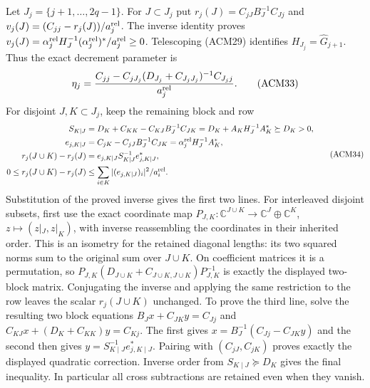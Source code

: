 Let $J_j=\{j+1,\ldots,2q-1\}$. For $J\subset J_j$ put
$r_j(J)=C_{jJ}B_J^{-1}C_{Jj}$ and
$v_j(J)=(C_{jj}-r_j(J))/a_j^{\rm rel}$.
The inverse identity proves
$v_j(J)=\alpha_j^{\rm rel}H_J^{-1}(\alpha_j^{\rm rel})^*/a_j^{\rm rel}
\geq0$. Telescoping (ACM29) identifies
$H_{J_j}=\widehat G_{j+1}$. Thus the exact decrement parameter is
\[
 \eta_j=
 \frac{C_{jj}-C_{jJ_j}(D_{J_j}+C_{J_jJ_j})^{-1}C_{J_jj}}
      {a_j^{\rm rel}}.
 \tag{ACM33}
\]
For disjoint $J,K\subset J_j$, keep the remaining block and row
\[
\begin{aligned}
 S_{K\mid J}&=D_K+C_{KK}-C_{KJ}B_J^{-1}C_{JK}
             =D_K+A_KH_J^{-1}A_K^*\succeq D_K>0,\\
 e_{j,K\mid J}&=C_{jK}-C_{jJ}B_J^{-1}C_{JK}
                =\alpha_j^{\rm rel}H_J^{-1}A_K^*,\\
 r_j(J\cup K)-r_j(J)&=e_{j,K\mid J}S_{K\mid J}^{-1}e_{j,K\mid J}^*,\\
 0\leq r_j(J\cup K)-r_j(J)
 &\leq\sum_{i\in K}|(e_{j,K\mid J})_i|^2/a_i^{\rm rel}.
\end{aligned}\tag{ACM34}
\]
Substitution of the proved inverse gives the first two lines.
For interleaved disjoint subsets, first use the exact coordinate map
$P_{J,K}:\mathbb{C}^{J\cup K}\to\mathbb{C}^J\oplus\mathbb{C}^K$,
$z\mapsto(z|_J,z|_K)$, with inverse reassembling the coordinates
in their inherited order. This is an isometry for the retained
diagonal lengths: its two squared norms sum to the original
sum over $J\cup K$. On coefficient matrices it is a permutation,
so $P_{J,K}(D_{J\cup K}+C_{J\cup K,J\cup K})P_{J,K}^{-1}$
is exactly the displayed two-block matrix. Conjugating the inverse
and applying the same restriction to the row leaves the scalar
$r_j(J\cup K)$ unchanged. To prove the third line, solve the
resulting two block equations
$B_Jx+C_{JK}y=C_{Jj}$ and
$C_{KJ}x+(D_K+C_{KK})y=C_{Kj}$.
The first gives $x=B_J^{-1}(C_{Jj}-C_{JK}y)$ and the second
then gives $y=S_{K\mid J}^{-1}e_{j,K\mid J}^*$.
Pairing with $(C_{jJ},C_{jK})$ proves exactly the displayed
quadratic correction. Inverse order from $S_{K\mid J}\succeq D_K$
gives the final inequality. In particular all cross subtractions
are retained even when they vanish.

